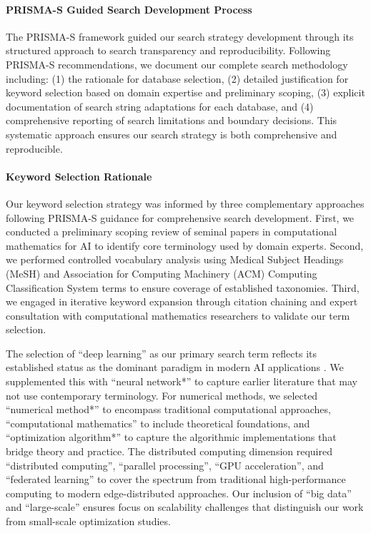 \documentclass[acmsmall]{acmart}
\begin{document}
\paragraph{PRISMA-S Guided Search Development Process}
The PRISMA-S framework guided our search strategy development through its structured approach to search transparency and reproducibility. Following PRISMA-S recommendations, we document our complete search methodology including: (1) the rationale for database selection, (2) detailed justification for keyword selection based on domain expertise and preliminary scoping, (3) explicit documentation of search string adaptations for each database, and (4) comprehensive reporting of search limitations and boundary decisions. This systematic approach ensures our search strategy is both comprehensive and reproducible.

\paragraph{Keyword Selection Rationale}
Our keyword selection strategy was informed by three complementary approaches following PRISMA-S guidance for comprehensive search development. First, we conducted a preliminary scoping review of seminal papers in computational mathematics for AI \citep{lecun2015deep, goodfellow2016deep, bottou2018optimization} to identify core terminology used by domain experts. Second, we performed controlled vocabulary analysis using Medical Subject Headings (MeSH) and Association for Computing Machinery (ACM) Computing Classification System terms to ensure coverage of established taxonomies. Third, we engaged in iterative keyword expansion through citation chaining and expert consultation with computational mathematics researchers to validate our term selection.

The selection of ``deep learning'' as our primary search term reflects its established status as the dominant paradigm in modern AI applications \citep{lecun2015deep}. We supplemented this with ``neural network*'' to capture earlier literature that may not use contemporary terminology. For numerical methods, we selected ``numerical method*'' to encompass traditional computational approaches, ``computational mathematics'' to include theoretical foundations, and ``optimization algorithm*'' to capture the algorithmic implementations that bridge theory and practice. The distributed computing dimension required ``distributed computing'', ``parallel processing'', ``GPU acceleration'', and ``federated learning'' to cover the spectrum from traditional high-performance computing to modern edge-distributed approaches. Our inclusion of ``big data'' and ``large-scale'' ensures focus on scalability challenges that distinguish our work from small-scale optimization studies.
\end{document}
